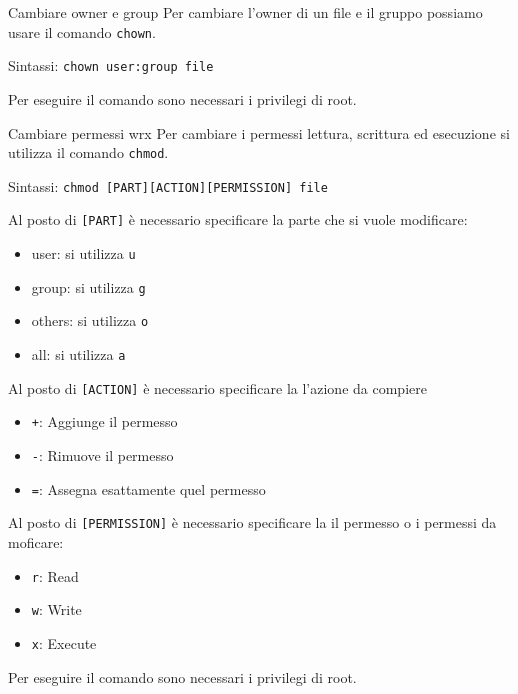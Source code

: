 \documentclass{beamer}
\begin{document}
\begin{frame}{Cambiare owner e group}
  Per cambiare l'owner di un file e il gruppo possiamo usare il comando 
  \texttt{chown}.\bigskip

  Sintassi: \texttt{chown user:group file}\bigskip

  Per eseguire il comando sono necessari i privilegi di root.
\end{frame}

\begin{frame}{Cambiare permessi wrx}
  Per cambiare i permessi lettura, scrittura ed esecuzione si utilizza il 
  comando \texttt{chmod}.\bigskip

  Sintassi: \texttt{chmod [PART][ACTION][PERMISSION] file}\bigskip

   {
    Al posto di \texttt{[PART]} è necessario specificare la 
    parte che si vuole modificare:
    \begin{itemize}
      \item user: si utilizza \texttt{u}
      \item group: si utilizza \texttt{g}
      \item others: si utilizza \texttt{o}
      \item all: si utilizza \texttt{a}
    \end{itemize}
  }

   {
    Al posto di \texttt{[ACTION]} è necessario specificare la 
    l'azione da compiere
    \begin{itemize}
      \item \texttt{+}: Aggiunge il permesso
      \item \texttt{-}: Rimuove il permesso
      \item \texttt{=}: Assegna esattamente quel permesso
    \end{itemize}
  }

   {
    Al posto di \texttt{[PERMISSION]} è necessario specificare la 
    il permesso o i permessi da moficare:
    \begin{itemize}
      \item \texttt{r}: Read
      \item \texttt{w}: Write
      \item \texttt{x}: Execute
    \end{itemize}
  }

  \bigskip Per eseguire il comando sono necessari i privilegi di root.
\end{frame}
\end{document}
